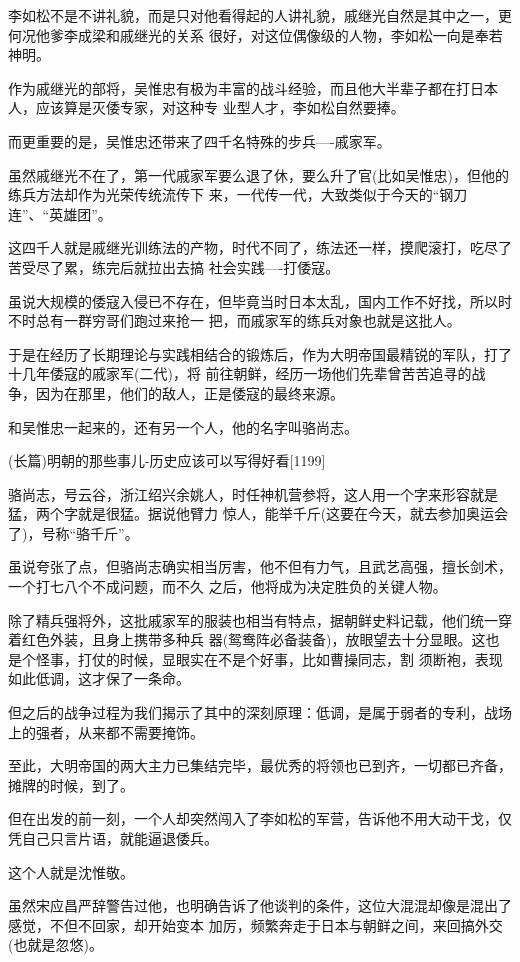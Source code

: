 \documentclass[11pt,a4paper,onecolumn]{article}
\begin{document}
李如松不是不讲礼貌，而是只对他看得起的人讲礼貌，戚继光自然是其中之一，更何况他爹李成梁和戚继光的关系
很好，对这位偶像级的人物，李如松一向是奉若神明。

作为戚继光的部将，吴惟忠有极为丰富的战斗经验，而且他大半辈子都在打日本人，应该算是灭倭专家，对这种专
业型人才，李如松自然要捧。

而更重要的是，吴惟忠还带来了四千名特殊的步兵----戚家军。

虽然戚继光不在了，第一代戚家军要么退了休，要么升了官(比如吴惟忠)，但他的练兵方法却作为光荣传统流传下
来，一代传一代，大致类似于今天的``钢刀连''、``英雄团''。

这四千人就是戚继光训练法的产物，时代不同了，练法还一样，摸爬滚打，吃尽了苦受尽了累，练完后就拉出去搞
社会实践----打倭寇。

虽说大规模的倭寇入侵已不存在，但毕竟当时日本太乱，国内工作不好找，所以时不时总有一群穷哥们跑过来抢一
把，而戚家军的练兵对象也就是这批人。

于是在经历了长期理论与实践相结合的锻炼后，作为大明帝国最精锐的军队，打了十几年倭寇的戚家军(二代)，将
前往朝鲜，经历一场他们先辈曾苦苦追寻的战争，因为在那里，他们的敌人，正是倭寇的最终来源。

和吴惟忠一起来的，还有另一个人，他的名字叫骆尚志。

(长篇)明朝的那些事儿-历史应该可以写得好看$[$1199$]$

骆尚志，号云谷，浙江绍兴余姚人，时任神机营参将，这人用一个字来形容就是猛，两个字就是很猛。据说他臂力
惊人，能举千斤(这要在今天，就去参加奥运会了)，号称``骆千斤''。

虽说夸张了点，但骆尚志确实相当厉害，他不但有力气，且武艺高强，擅长剑术，一个打七八个不成问题，而不久
之后，他将成为决定胜负的关键人物。

除了精兵强将外，这批戚家军的服装也相当有特点，据朝鲜史料记载，他们统一穿着红色外装，且身上携带多种兵
器(鸳鸯阵必备装备)，放眼望去十分显眼。这也是个怪事，打仗的时候，显眼实在不是个好事，比如曹操同志，割
须断袍，表现如此低调，这才保了一条命。

但之后的战争过程为我们揭示了其中的深刻原理：低调，是属于弱者的专利，战场上的强者，从来都不需要掩饰。

至此，大明帝国的两大主力已集结完毕，最优秀的将领也已到齐，一切都已齐备，摊牌的时候，到了。

但在出发的前一刻，一个人却突然闯入了李如松的军营，告诉他不用大动干戈，仅凭自己只言片语，就能逼退倭兵。

这个人就是沈惟敬。

虽然宋应昌严辞警告过他，也明确告诉了他谈判的条件，这位大混混却像是混出了感觉，不但不回家，却开始变本
加厉，频繁奔走于日本与朝鲜之间，来回搞外交(也就是忽悠)。
\end{document}
